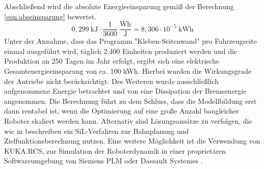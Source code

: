 %
Abschließend wird die absolute Energieeinsparung gemäß der Berechnung \ref{eqn:abseinsparung} bewertet. 
% 
\begin{equation}
	\label{eqn:abseinsparung}
	 0,299~\text{kJ} \cdot \dfrac{1}{3600}~ \dfrac{\text{Wh}}{\text{J}} = 8,306 \cdot 10^{-5}~\text{kWh}
\end{equation}
%
Unter der Annahme, dass das Programm "Kleben-Seitenwand" pro Fahrzeugseite einmal ausgeführt wird, täglich 2.400 Einheiten produziert werden und die Produktion an 250 Tagen im Jahr erfolgt, ergibt sich eine elektrische Gesamtenergieeinsparung von ca. 100 kWh. Hierbei wurden die Wirkungsgrade der Antriebe nicht berücksichtigt. Des Weiteren wurde ausschließlich aufgenommene Energie betrachtet und von eine Dissipation der Bremsenergie angenommen. Die Berechnung führt zu dem Schluss, dass die Modellbildung erst dann rentabel ist, wenn die Optimierung auf eine große Anzahl baugleicher Roboter skaliert werden kann. Alternativ sind Lösungsansätze zu verfolgen, die wie in \cite[S.~40]{Eggers.2019} beschreiben ein SiL-Verfahren zur Bahnplanung und Zielfunktionsberechnung nutzen. Eine weitere Möglichkeit ist die Verwendung von KUKA.RCS, zur Simulation der Roboterdynamik in einer proprietären Softwareumgebung von Siemens PLM oder Dassault Systemes \cite{RCS.2019}. 
